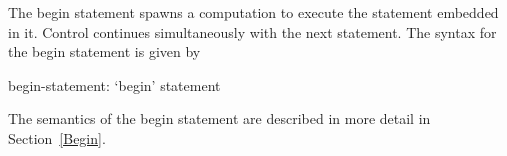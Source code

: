 The begin statement spawns a computation to execute the statement
embedded in it.  Control continues simultaneously with the next
statement.  The syntax for the begin statement is given by
\begin{syntax}
begin-statement:
  `begin' statement
\end{syntax}

The semantics of the begin statement are described in more detail in
Section~\ref{Begin}.
